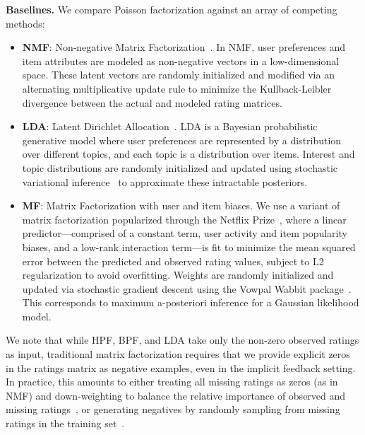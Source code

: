 {\bf Baselines.} We compare Poisson factorization against an array of
competing methods:
\begin{itemize}
  \item {\bf NMF}: Non-negative Matrix
    Factorization~\cite{Lee:1999}. In NMF, user preferences and item
    attributes are modeled as non-negative vectors in a
    low-dimensional space. These latent vectors are randomly
    initialized and modified via an alternating multiplicative update
    rule to minimize the Kullback-Leibler divergence between the
    actual and modeled rating matrices.

  \item {\bf LDA}: Latent Dirichlet Allocation~\cite{Blei:2003b}. LDA
    is a Bayesian probabilistic generative model where user preferences
    are represented by a distribution over different topics, and each
    topic is a distribution over items. Interest and topic
    distributions are randomly initialized and updated using
    stochastic variational inference~\cite{Hoffman:2010a} to
    approximate these intractable posteriors.

  \item {\bf MF}: Matrix Factorization with user and item biases. We
    use a variant of matrix factorization popularized through the
    Netflix Prize~\cite{Koren:2009}, where a linear
    predictor---comprised of a constant term, user activity and item
    popularity biases, and a low-rank interaction term---is fit to
    minimize the mean squared error between the predicted and observed
    rating values, subject to L2 regularization to avoid
    overfitting. Weights are randomly initialized and updated via
    stochastic gradient descent using the Vowpal Wabbit
    package~\cite{Weinberger:2009}. This corresponds to maximum
    a-posteriori inference for a Gaussian likelihood model.

\end{itemize}

We note that while HPF, BPF, and LDA take only the non-zero observed
ratings as input, traditional matrix factorization requires that we
provide explicit zeros in the ratings matrix as negative examples,
even in the implicit feedback setting. In practice, this amounts to
either treating all missing ratings as zeros (as in NMF) and
down-weighting to balance the relative importance of observed and
missing ratings~\cite{Hu:2008p9402}, or generating negatives by
randomly sampling from missing ratings in the training
set~\cite{Dror:2012a}.

